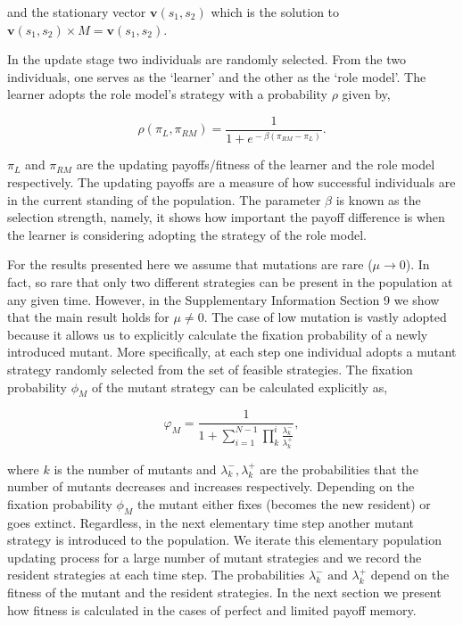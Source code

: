 \documentclass[11pt]{article}
\theoremstyle{plainCl1}
\theoremstyle{plainCl2}
\begin{document}
\begin{equation}\label{eq:transition_matrix}
  
\end{equation}

and the stationary vector \(\mathbf{v}(s_1,s_2)\)
which is the solution to \(\mathbf{v}(s_1,s_2) \times M 
= \mathbf{v}(s_1,s_2)\).

In the update stage two individuals are randomly selected. From the two
individuals, one  serves as the `learner' and the other as the `role model'. The
learner adopts the role model's strategy with a probability \(\rho\) given by,

\begin{equation} \label{Eq:rho}
    \rho(\pi_{L}, \pi_{RM}) = \frac{1}{1\!+\! e^{\!-\!\beta (\pi_{RM}\!-\! \pi_{L})}}.
\end{equation}

\(\pi_{L}\) and \(\pi_{RM}\) are the updating payoffs/fitness of the learner and the
role model respectively. The updating payoffs are a measure of how successful
individuals are in the current standing of the population. The parameter
\(\beta\) is known as the selection strength, namely, it shows how important the
payoff difference is when the learner is considering adopting the strategy of
the role model.

For the results presented here we assume that mutations are rare (\(\mu
\rightarrow 0\)). In fact, so rare that only two different strategies can be
present in the population at any given time. However, in the Supplementary Information
Section 9 we show that the main result holds for \(\mu \neq 0\).
The case of low mutation is vastly adopted because it allows us to explicitly
calculate the fixation probability of a newly introduced mutant. More specifically,
at each step
one individual adopts a mutant strategy randomly selected from the set of
feasible strategies. The fixation probability \(\phi_{M}\) of the mutant
strategy can be calculated explicitly as,

\begin{equation}\label{eq:appendix_fixation_probability}
    \varphi_{M} = \frac{1}{1+\sum\limits_{i=1}^{N-1}\prod\limits_k^i \frac{\lambda^-_k}{\lambda^+_k}},
\end{equation}

where \(k\) is the number of
mutants and \(\lambda^-_k, \lambda^+_k\) are the probabilities that the number of
mutants decreases and increases respectively.
Depending on the fixation probability \(\phi_{M}\) the mutant either
fixes (becomes the new resident) or goes extinct. Regardless, in the next elementary
time step another mutant strategy is introduced to the population. We iterate
this elementary population updating process for a large number of mutant
strategies and we record the resident strategies at each time step. The
probabilities \(\lambda^-_k \text{ and } \lambda^+_k\) depend on the fitness
of the mutant and the resident strategies. In the next section we
present how fitness is calculated in the cases of perfect and limited payoff memory.
\end{document}
